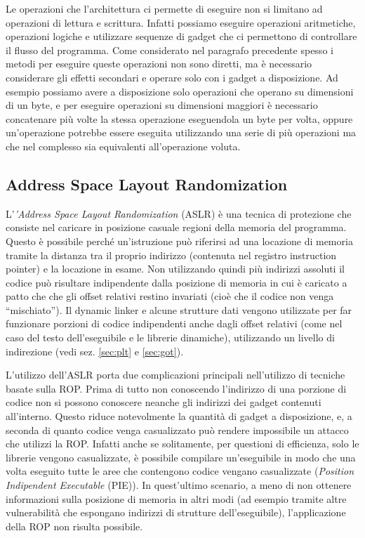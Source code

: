 Le operazioni che l'architettura ci permette di eseguire non si
limitano ad operazioni di lettura e scrittura. Infatti possiamo
eseguire operazioni aritmetiche, operazioni logiche e utilizzare
sequenze di gadget che ci permettono di controllare il flusso del
programma. Come considerato nel paragrafo precedente spesso i metodi
per eseguire queste operazioni non sono diretti, ma è necessario
considerare gli effetti secondari e operare solo con i gadget a
disposizione. Ad esempio possiamo avere a disposizione solo operazioni
che operano su dimensioni di un byte, e per eseguire operazioni su
dimensioni maggiori è necessario concatenare più volte la stessa
operazione eseguendola un byte per volta, oppure un'operazione
potrebbe essere eseguita utilizzando una serie di più operazioni ma
che nel complesso sia equivalenti all'operazione voluta.

\subsection{Address Space Layout Randomization}

L'\emph{'Address Space Layout Randomization} (ASLR) è una tecnica di
protezione che consiste nel caricare in posizione casuale regioni
della memoria del programma. Questo è possibile perché un'istruzione
può riferirsi ad una locazione di memoria tramite la distanza tra il
proprio indirizzo (contenuta nel registro instruction pointer) e la
locazione in esame. Non utilizzando quindi più indirizzi assoluti il
codice può risultare indipendente dalla posizione di memoria in cui è
caricato a patto che che gli offset relativi restino invariati (cioè
che il codice non venga ``mischiato''). Il dynamic linker e alcune
strutture dati vengono utilizzate per far funzionare porzioni di
codice indipendenti anche dagli offset relativi (come nel caso del
testo dell'eseguibile e le librerie dinamiche), utilizzando un livello
di indirezione (vedi sez. \ref{sec:plt} e \ref{sec:got}).

L'utilizzo dell'ASLR porta due complicazioni principali nell'utilizzo
di tecniche basate sulla ROP. Prima di tutto non conoscendo
l'indirizzo di una porzione di codice non si possono conoscere neanche
gli indirizzi dei gadget contenuti all'interno. Questo riduce
notevolmente la quantità di gadget a disposizione, e, a seconda di
quanto codice venga casualizzato può rendere impossibile un attacco
che utilizzi la ROP. Infatti anche se solitamente, per questioni di
efficienza, solo le librerie vengono casualizzate, è possibile
compilare un'eseguibile in modo che una volta eseguito tutte le aree
che contengono codice vengano casualizzate (\emph{Position Indipendent
  Executable} (PIE)). In quest'ultimo scenario, a meno di non ottenere
informazioni sulla posizione di memoria in altri modi (ad esempio
tramite altre vulnerabilità che espongano indirizzi di strutture
dell'eseguibile), l'applicazione della ROP non risulta possibile.

